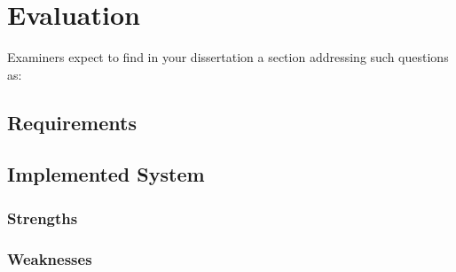 \chapter{Evaluation}

Examiners expect to find in your dissertation a section addressing such questions as:






\section{Requirements}




\section{Implemented System}
\subsection{Strengths}
\subsection{Weaknesses}
